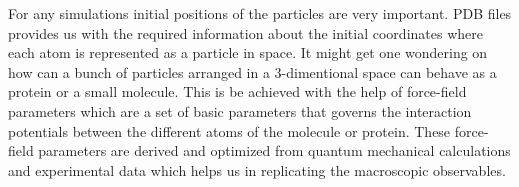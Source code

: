 For any simulations initial positions of the particles are very important.
PDB files provides us with the required information about the initial coordinates where each atom is represented as a particle in space.
It might get one wondering on how can a bunch of particles arranged in a 3-dimentional space can behave as a protein or a small molecule.
This is be achieved with the help of force-field parameters which are a set of basic parameters that governs the interaction potentials between the different atoms of the molecule or protein.
These force-field parameters are derived and optimized from quantum mechanical calculations and experimental data which helps us in replicating the macroscopic observables.
    